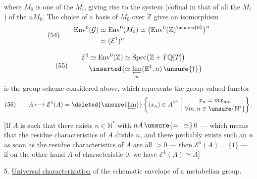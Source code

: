 

where $M_0$ is one of the $M_i$, giving rise
to the system (cofinal in that of all the
$M_i$) of the $nM_0$. The choice of a
basis of $M_0$ over $\mathbb{Z}$ gives an
isomorphism
\[
(54)\qquad
\begin{aligned}
\operatorname{Env}^{0}(\mathcal{G})
&\simeq \operatorname{Env}^{0}(M_0)
\simeq \bigl(\operatorname{Env}^{0}(\mathbb{Z})^{\unsure{0}}\bigr)^n\\
&\simeq(\mathcal{E}^{1})^n
\end{aligned}
\]


\[
(55)\qquad
\begin{aligned}
\mathcal{E}^{1}
&\simeq \operatorname{Env}^{0}(\mathbb{Z})
\simeq\operatorname{Spec}\bigl(\mathbb{Z}+T\mathbb{Q}[T]\bigr)\\
&\inserted{\simeq\varprojlim_n(\mathbb{E}^{1},n)\,\unsure{\dagger}}
\end{aligned}
\]
is the group scheme considered
above, which represents the group-valued functor
\[
(56)\qquad
A\longmapsto\mathcal{E}^{1}(A)
=\deleted{\unsure{\varprojlim}}
\left\{(x_n)\in A^{\mathbb{N}^{*}}\ \middle|\
\begin{gathered}
x_n=mx_{mn}\\[-2pt]
\forall m,n\in\unsure{\mathbb{N}^{*}}
\end{gathered}
\right\}.
\]

[If $A$ is such that there exists $n\in\mathbb{N}^{*}$ with
$nA\,\unsure{=|\simeq}\,0$ ---
which means
that the residue characteristics of $A$ divide $n$,
and  there probably exists such an $n$
as soon as the residue characteristics of $A$ are
all $>0$ --- then $\mathcal{E}^{1}(A)=\{1\}$ ---
if on the other hand $A$ of characteristic $0$, we have $\mathcal{E}^{1}(A)\simeq A$]



5. \uline{Universal characterization} of the schematic envelope of a metabelian group.

